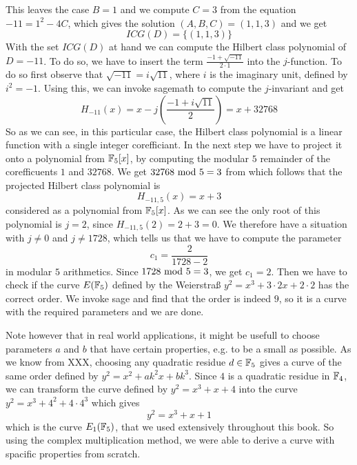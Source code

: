 \begin{example}
This leaves the case $B=1$ and we compute $C=3$ from the equation $-11 = 1^2 -4C$, which gives the solution $(A,B,C)=(1,1,3)$ and we get
$$
ICG(D)=\{(1,1,3)\}
$$
With the set $ICG(D)$ at hand we can compute the Hilbert class polynomial of $D=-11$. To do so, we have to insert the term $\frac{-1+\sqrt{-11}}{2\cdot1}$ into the $j$-function. To do so first observe that $\sqrt{-11}=i\sqrt{11}$, where $i$ is the imaginary unit, defined by $i^2=-1$. Using this, we can invoke sagemath to compute the $j$-invariant and get 
$$
H_{-11}(x) = x - j\left(\frac{-1+i\sqrt{11}}{2}\right) = x + 32768
$$
So as we can see, in this particular case, the Hilbert class polynomial is a linear function with a single integer corefficiant. In the next step we have to project it onto a polynomial from $\mathbb{F}_5[x]$, by computing the modular $5$ remainder of the corefficuents $1$ and $32768$. We get $32768 \text{ mod } 5=3$ from which follows that the projected Hilbert class polynomial is  
$$
H_{-11,5}(x)=x+3
$$ 
considered as a polynomial from $\mathbb{F}_5[x]$. As we can see the only root of this polynomial is $j=2$, since $H_{-11,5}(2)=2+3=0$. We therefore have a situation with $j\neq 0$ and $j\neq 1728$, which tells us that we have to compute the parameter
$$
c_1=\frac{2}{1728-2}
$$
in modular $5$ arithmetics. Since $1728 \text{ mod } 5=3$, we get $c_1=2$. Then we have to check if the curve $E(\mathbb{F}_5)$ defined by the Weierstraß  $y^2 = x^3 + 3\cdot 2 x + 2\cdot 2$ has the correct order. We invoke sage and find that the order is indeed $9$, so it is a curve with the required parameters and we are done.

Note however that in real world applications, it might be usefull to choose parameters $a$ and $b$ that have certain properties, e.g. to be a small as possible. As we know from XXX, choosing any quadratic residue $d\in \mathbb{F}_5$ gives a curve of the same order defined by $y^2 = x^2 + a k^2 x + bk^3$. Since $4$ is a quadratic residue in $\mathbb{F}_4$, we can transform the curve defined by 
$y^2 = x^3 +x+4$ into the curve $y^2 = x^3 + 4^2 + 4\cdot 4^3$ which gives 
$$
y^2 = x^3 + x +1
$$
which is the curve $E_1(\mathbb{F}_5)$, that we used extensively throughout this book. So using the complex multiplication method, we were able to derive a curve with spacific properties from scratch.
\end{example}
